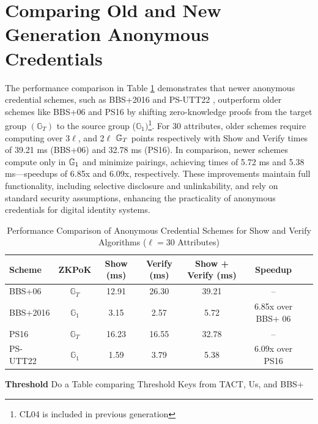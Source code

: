 \section{Comparing Old and New Generation Anonymous Credentials}
The performance comparison in Table \ref{tab:anon_creds_performance_old_gen_vs_new} demonstrates that newer anonymous credential schemes, such as BBS+2016 \cite{camenisch_anonymous_2016} and PS-UTT22 \cite{tomescu_utt_2022}, outperform older schemes like BBS+06 \cite{hutchison_constant-size_2006} and PS16 \cite{sako_short_2016} by shifting zero-knowledge proofs from the target group $(\mathbb{G}_T)$ to the source group ($\mathbb{G}_1)$\footnote{CL04 \cite{hutchison_signature_2004} is included in previous generation}. For 30 attributes, older schemes require computing over 3$\ell$, and 2$\ell$ $\mathbb{G}_T$ points respectively with Show and Verify times of 39.21 ms (BBS+06) and 32.78 ms (PS16). In comparison, newer schemes compute only in $\mathbb{G}_1$ and minimize pairings, achieving times of 5.72 ms and 5.38 ms—speedups of 6.85x and 6.09x, respectively. These improvements maintain full functionality, including selective disclosure and unlinkability, and rely on standard security assumptions, enhancing the practicality of anonymous credentials for digital identity systems.

\begin{table}[h]
\centering
\caption{Performance Comparison of Anonymous Credential Schemes for Show and Verify Algorithms ($\ell = 30$ Attributes)}
\label{tab:anon_creds_performance_old_gen_vs_new}
\begin{tabular}{|l|c|c|c|c|c|c|}
\hline
\textbf{Scheme} & \textbf{ZKPoK}  & \textbf{Show (ms)} & \textbf{Verify (ms)}  & \textbf{Show + Verify (ms)} & \textbf{Speedup} \\
\hline
BBS+06 & $\mathbb{G}_T$ & 12.91  & 26.30 & 39.21 & -- \\
\hline
BBS+2016 & $\mathbb{G}_1$ & 3.15  & 2.57 & 5.72 & 6.85x over BBS+ 06 \\
\hline
PS16 & $\mathbb{G}_T$ & 16.23  & 16.55 & 32.78 & -- \\
\hline
PS-UTT22 & $\mathbb{G}_1$ & 1.59  & 3.79 & 5.38 & 6.09x over PS16 \\
\hline
\end{tabular}
\end{table}


\textbf{Threshold}
Do a Table comparing Threshold Keys from TACT, Us, and BBS+




